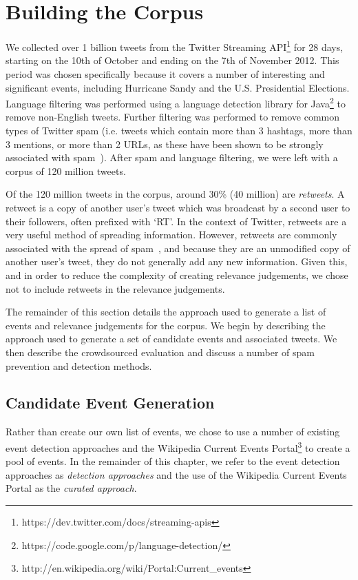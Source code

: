 

\section{Building the Corpus}
\label{sec:methodology}
\label{collection:sec:methodology}
We collected over 1 billion tweets from the Twitter Streaming API\footnote{https://dev.twitter.com/docs/streaming-apis} for 28 days, starting on the 10th of October and ending on the 7th of November 2012.
This period was chosen specifically because it covers a number of interesting and significant events, including Hurricane Sandy and the U.S. Presidential Elections.
Language filtering was performed using a language detection library for Java\footnote{https://code.google.com/p/language-detection/} to remove non-English tweets.
Further filtering was performed to remove common types of Twitter spam (i.e. tweets which contain more than 3 hashtags, more than 3 mentions, or more than 2 URLs, as these have been shown to be strongly associated with spam~\citep{benevenuto2010detecting}).
After spam and language filtering, we were left with a corpus of 120 million tweets.

Of the 120 million tweets in the corpus, around 30\% (40 million) are \emph{retweets}.
A retweet is a copy of another user's tweet which was broadcast by a second user to their followers, often prefixed with `RT'.
In the context of Twitter, retweets are a very useful method of spreading information.
However, retweets are commonly associated with the spread of spam~\citep{5428313}, and because they are an unmodified copy of another user's tweet, they do not generally add any new information.
Given this, and in order to reduce the complexity of creating relevance judgements, we chose not to include retweets in the relevance judgements.

The remainder of this section details the approach used to generate a list of events and relevance judgements for the corpus.
We begin by describing the approach used to generate a set of candidate events and associated tweets.
We then describe the crowdsourced evaluation and discuss a number of spam prevention and detection methods.


\subsection{Candidate Event Generation}
Rather than create our own list of events, we chose to use a number of existing event detection approaches and the Wikipedia Current Events Portal\footnote{http://en.wikipedia.org/wiki/Portal:Current\_events} to create a pool of events.
In the remainder of this chapter, we refer to the event detection approaches as \emph{detection approaches} and the use of the Wikipedia Current Events Portal as the \emph{curated approach}.

